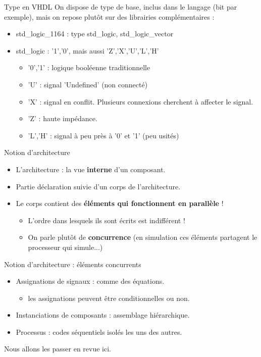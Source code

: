 \documentclass[xcolor=table]{beamer} %
\begin{document}
\begin{frame}{Type en VHDL}
  On dispose de type de base, inclus dans le langage (bit par exemple), mais on repose
  plutôt sur des librairies complémentaires :
  \begin{itemize}
    \item std\_logic\_1164 : type std\_logic, std\_logic\_vector
    \item std\_logic : '1','0', mais aussi 'Z','X','U','L','H'
    \begin{itemize}
      \item '0','1' : logique booléenne traditionnelle
      \item 'U' : signal 'Undefined' (non connecté)
      \item 'X' : signal en conflit. Plusieurs connexions cherchent à affecter le signal.
      \item 'Z' : haute impédance.
      \item 'L','H' : signal à peu près à '0' et '1' (peu usités)
    \end{itemize}
  \end{itemize}
\end{frame}

\begin{frame}{Notion d'architecture}
  \begin{itemize}
    \item L'architecture : la vue \textbf{interne} d'un composant.
    \item Partie déclaration suivie d'un corps de l'architecture.
    \item Le corps contient des \textbf{éléments qui fonctionnent en parallèle} !
    \begin{itemize}
      \item L'ordre dans lesquels ils sont écrits est indifférent !
      \item On parle plutôt de \textbf{concurrence} (en simulation ces éléments partagent le processeur qui simule...)
    \end{itemize}
  \end{itemize}
\end{frame}

\begin{frame}{Notion d'architecture : éléments concurrents}
  \begin{itemize}
    \item Assignations de signaux : comme des équations.
    \begin{itemize}
      \item les assignations peuvent être conditionnelles ou non.
    \end{itemize}
    \item Instanciations de composants : assemblage hiérarchique.
    \item Processus : codes séquentiels isolés les uns des autres.
  \end{itemize}
  Nous allons les passer en revue ici.
\end{frame}
\end{document}
